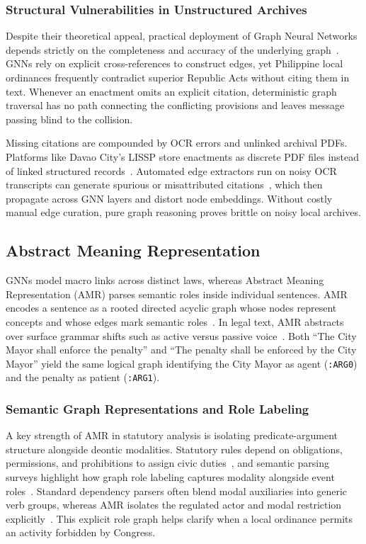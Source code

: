         \subsubsection{Structural Vulnerabilities in Unstructured Archives}
        Despite their theoretical appeal, practical deployment of Graph Neural Networks depends strictly on the completeness and accuracy of the underlying graph~\cite{humphreys2020populating}. GNNs rely on explicit cross-references to construct edges, yet Philippine local ordinances frequently contradict superior Republic Acts without citing them in text. Whenever an enactment omits an explicit citation, deterministic graph traversal has no path connecting the conflicting provisions and leaves message passing blind to the collision.

        Missing citations are compounded by OCR errors and unlinked archival PDFs. Platforms like Davao City's LISSP store enactments as discrete PDF files instead of linked structured records~\cite{conchas2025digital}. Automated edge extractors run on noisy OCR transcripts can generate spurious or misattributed citations~\cite{lopresti2008optical}, which then propagate across GNN layers and distort node embeddings. Without costly manual edge curation, pure graph reasoning proves brittle on noisy local archives.

    \subsection{Abstract Meaning Representation}
    GNNs model macro links across distinct laws, whereas Abstract Meaning Representation (AMR) parses semantic roles inside individual sentences. AMR encodes a sentence as a rooted directed acyclic graph whose nodes represent concepts and whose edges mark semantic roles~\cite{banarescu2013abstract}. In legal text, AMR abstracts over surface grammar shifts such as active versus passive voice~\cite{banarescu2013abstract, trong2018an}. Both ``The City Mayor shall enforce the penalty'' and ``The penalty shall be enforced by the City Mayor'' yield the same logical graph identifying the City Mayor as agent (\texttt{:ARG0}) and the penalty as patient (\texttt{:ARG1}).

        \subsubsection{Semantic Graph Representations and Role Labeling}
        A key strength of AMR in statutory analysis is isolating predicate-argument structure alongside deontic modalities. Statutory rules depend on obligations, permissions, and prohibitions to assign civic duties~\cite{agotnes2007on, humphreys2020populating}, and semantic parsing surveys highlight how graph role labeling captures modality alongside event roles~\cite{tohidi2024abstract}. Standard dependency parsers often blend modal auxiliaries into generic verb groups, whereas AMR isolates the regulated actor and modal restriction explicitly~\cite{trong2018an}. This explicit role graph helps clarify when a local ordinance permits an activity forbidden by Congress.

